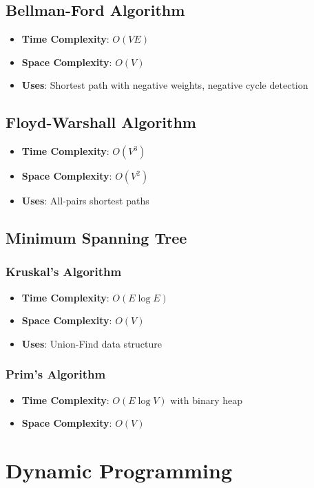\documentclass[11pt]{article}
\theoremstyle{definition}
\begin{document}
\subsection{Bellman-Ford Algorithm}
\begin{itemize}
    \item \textbf{Time Complexity}: $O(VE)$
    \item \textbf{Space Complexity}: $O(V)$
    \item \textbf{Uses}: Shortest path with negative weights, negative cycle detection
\end{itemize}

\subsection{Floyd-Warshall Algorithm}
\begin{itemize}
    \item \textbf{Time Complexity}: $O(V^3)$
    \item \textbf{Space Complexity}: $O(V^2)$
    \item \textbf{Uses}: All-pairs shortest paths
\end{itemize}

\subsection{Minimum Spanning Tree}
\subsubsection{Kruskal's Algorithm}
\begin{itemize}
    \item \textbf{Time Complexity}: $O(E \log E)$
    \item \textbf{Space Complexity}: $O(V)$
    \item \textbf{Uses}: Union-Find data structure
\end{itemize}

\subsubsection{Prim's Algorithm}
\begin{itemize}
    \item \textbf{Time Complexity}: $O(E \log V)$ with binary heap
    \item \textbf{Space Complexity}: $O(V)$
\end{itemize}

\section{Dynamic Programming}
\end{document}
